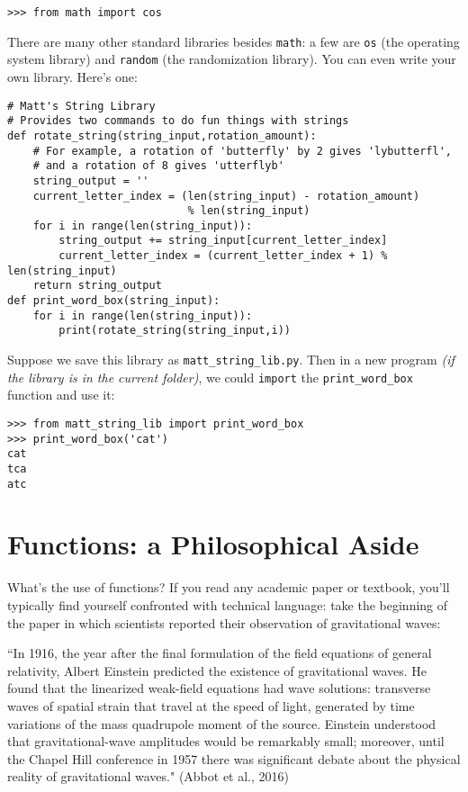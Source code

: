 \begin{lstlisting}[numbers=none]
>>> from math import cos
\end{lstlisting}

There are many other standard libraries besides \texttt{math}: a few are \texttt{os} (the operating system library) and \texttt{random} (the randomization library). You can even write your own library. Here's one:

\begin{lstlisting}
# Matt's String Library
# Provides two commands to do fun things with strings
def rotate_string(string_input,rotation_amount): 
	# For example, a rotation of 'butterfly' by 2 gives 'lybutterfl', 
	# and a rotation of 8 gives 'utterflyb'
	string_output = ''
	current_letter_index = (len(string_input) - rotation_amount) 
						    % len(string_input)
	for i in range(len(string_input)):
		string_output += string_input[current_letter_index]
		current_letter_index = (current_letter_index + 1) % len(string_input)
	return string_output
def print_word_box(string_input):
	for i in range(len(string_input)):
		print(rotate_string(string_input,i))
\end{lstlisting}

Suppose we save this library as \texttt{matt\_string\_lib.py}. Then in a new program \emph{(if the library is in the current folder)}, we could \texttt{import} the \texttt{print\_word\_box} function and use it:

\begin{lstlisting}[numbers=none]
>>> from matt_string_lib import print_word_box
>>> print_word_box('cat')
cat
tca
atc
\end{lstlisting}

\section*{Functions: a Philosophical Aside}

What's the use of functions?
If you read any academic paper or textbook, you'll typically find yourself confronted with technical language: take the beginning of the paper in which scientists reported their observation of gravitational waves:

``In 1916, the year after the final formulation of the field equations of general relativity, Albert Einstein predicted the existence of gravitational waves. He found that the linearized weak-field equations had wave solutions: transverse waves of spatial strain that travel at the speed of light, generated by time variations of the mass quadrupole moment of the source. Einstein understood that gravitational-wave amplitudes would be remarkably small; moreover, until the Chapel Hill conference in 1957 there was significant debate about the physical reality of gravitational waves." (Abbot et al., 2016)

